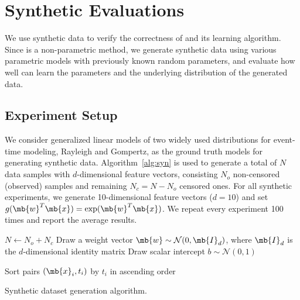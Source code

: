 \section{Synthetic Evaluations}\label{sec:synthetic}
We use synthetic data to verify the correctness of \npglm and its learning algorithm. Since \npglm is a non-parametric method, we generate synthetic data using various parametric models with previously known random parameters, and evaluate how well \npglm can learn the parameters and the underlying distribution of the generated data.

\subsection{Experiment Setup}
We consider generalized linear models of two widely used distributions for event-time modeling, Rayleigh and Gompertz, as the ground truth models for generating synthetic data. Algorithm~\ref{alg:syn} is used to generate a total of $N$ data samples with $d$-dimensional feature vectors, consisting $N_o$ non-censored (observed) samples and remaining $N_c=N-N_o$ censored ones. For all synthetic experiments, we generate 10-dimensional feature vectors ($d=10$) and set $g(\mb{w}^T\mb{x})=\exp(\mb{w}^T\mb{x})$. We repeat every experiment 100 times and report the average results.

\begin{algorithm}[t]
	\small
	\SetAlgoLined
	$N\leftarrow N_o+N_c$\;
	Draw a weight vector $\mb{w}\sim\mathcal{N}(0,\mb{I}_d)$, where $\mb{I}_d$ is the $d$-dimensional identity matrix\;
	Draw scalar intercept $b\sim\mathcal{N}(0,1)$\;
	
	Sort pairs $(\mb{x}_i,t_i)$ by $t_i$ in ascending order\;
	
	\caption{Synthetic dataset generation algorithm.}
	\label{alg:syn}
\end{algorithm}


